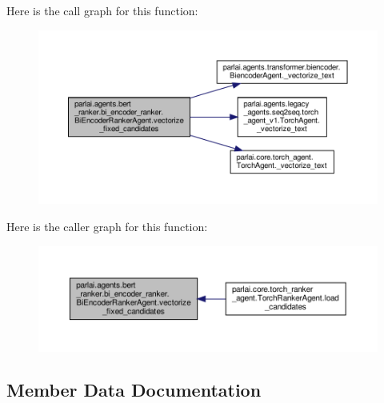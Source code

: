 Here is the call graph for this function\+:
\nopagebreak
\begin{figure}[H]
\begin{center}
\leavevmode
\includegraphics[width=350pt]{classparlai_1_1agents_1_1bert__ranker_1_1bi__encoder__ranker_1_1BiEncoderRankerAgent_a3062adbae2449553b4a6e12c5973116d_cgraph}
\end{center}
\end{figure}
Here is the caller graph for this function\+:
\nopagebreak
\begin{figure}[H]
\begin{center}
\leavevmode
\includegraphics[width=350pt]{classparlai_1_1agents_1_1bert__ranker_1_1bi__encoder__ranker_1_1BiEncoderRankerAgent_a3062adbae2449553b4a6e12c5973116d_icgraph}
\end{center}
\end{figure}


\subsection{Member Data Documentation}
\mbox{\label{classparlai_1_1agents_1_1bert__ranker_1_1bi__encoder__ranker_1_1BiEncoderRankerAgent_a8db10fcd38687ecaf7bf1bc83837a16f}} 
